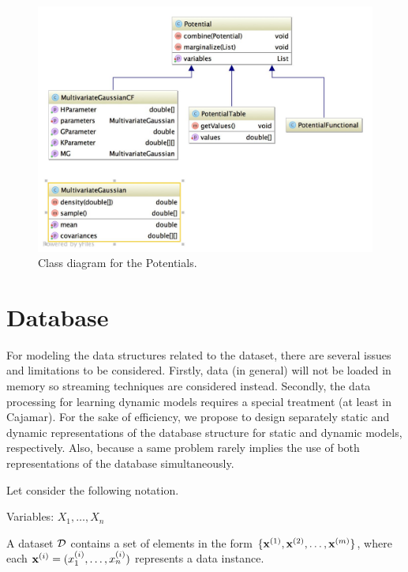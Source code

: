 \documentclass[a4paper,12pt]{article}
\begin{document}
\begin{figure}[h]
\includegraphics[width=\textwidth]{potentials.jpg}
\caption{Class diagram for the Potentials.}
\label{fig:classDiagramPotentials}
\end{figure}


\section{Database}

For modeling the data structures related to the dataset, there are several issues 
and limitations to be considered. Firstly, data (in general) will not be loaded in memory so streaming
techniques are considered instead. 
Secondly, the data processing for learning dynamic models requires a special treatment (at least in Cajamar).
For the sake of efficiency, we propose to design separately static and 
dynamic representations of the database structure for static and dynamic models, respectively. 
Also, because a same problem rarely implies the use of both representations of the database simultaneously.

Let consider the following notation. 

Variables: $X_1, \ldots, X_n$

A dataset $\cal{D}$ contains a set of elements in the form $\{\x^{(1)}, \x^{(2)},\ldots, \x^{(m)}\}$, 
where each $\x^{(i)}=(x_1^{(i)}, \ldots, x_n^{(i)})$ represents a data instance.





\end{document}
